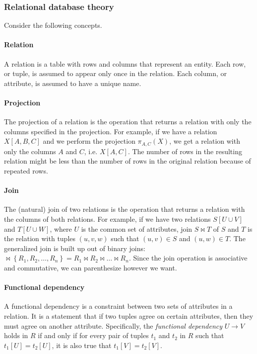 
\subsubsection{Relational database theory}

Consider the following concepts.

\paragraph{Relation}  A relation is a table with rows and columns that represent
an entity.  Each row, or tuple, is assumed to appear only once in the relation.  Each
column, or attribute, is assumed to have a unique name.

\paragraph{Projection}  The projection of a relation is the operation that returns a
relation with only the columns specified in the projection.  For example, if we have a
relation $X[A, B, C]$ and we perform the projection $\pi_{A, C}(X)$, we get a
relation with only the columns $A$ and $C$, i.e. $X[A, C]$.  The number of rows
in the resulting relation might be less than the number of rows in the original relation
because of repeated rows.

\paragraph{Join}  The (natural) join of two relations is the operation that returns a
relation with the columns of both relations.  For example, if we have two relations $S[U
\cup V]$ and $T[U \cup W]$, where $U$ is the common set of attributes, join $S \bowtie T$
of $S$ and $T$ is the relation with tuples $(u, v, w)$ such that $(u, v) \in S$ and $(u,
w) \in T$.  The generalized join is built up out of binary joins:  $\bowtie \left\{ R_1,
R_2, \dots, R_n \right\} = R_1 \bowtie R_2 \bowtie \dots \bowtie R_n$. Since the join
operation is associative and commutative, we can parenthesize however we want.

\paragraph{Functional dependency}  A functional dependency is a constraint between two
sets of attributes in a relation.  It is a statement that if two tuples agree on certain
attributes, then they must agree on another attribute.  Specifically, the \emph{functional
dependency} $U \to V$ holds in $R$ if and only if for every pair of tuples $t_1$ and $t_2$
in $R$ such that $t_1[U] = t_2[U]$, it is also true that $t_1[V] = t_2[V]$.

